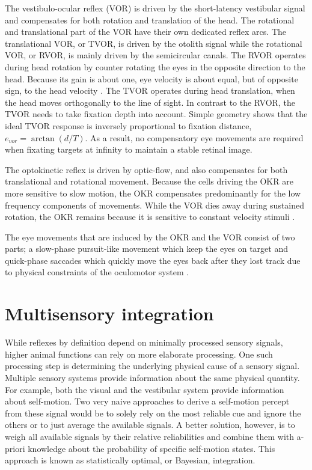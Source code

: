 The vestibulo-ocular reflex (VOR) is driven by the short-latency vestibular signal and compensates for both rotation and translation of the head. The rotational and translational part of the VOR have their own dedicated reflex arcs. The translational VOR, or TVOR, is driven by the otolith signal while the rotational VOR, or RVOR, is mainly driven by the semicircular canals. The RVOR operates during head rotation by counter rotating the eyes in the opposite direction to the head. Because its gain is about one, eye velocity is about equal, but of opposite sign, to the head velocity \cite{goldberg2012}. The TVOR operates during head translation, when the head moves orthogonally to the line of sight. In contrast to the RVOR, the TVOR needs to take fixation depth into account. Simple geometry shows that the ideal TVOR response is inversely proportional to fixation distance, $e_{vor} = \arctan(d/T)$. As a result, no compensatory eye movements are required when fixating targets at infinity to maintain a stable retinal image. 

The optokinetic reflex is driven by optic-flow, and also compensates for both translational and rotational movement. Because the cells driving the OKR are more sensitive to slow motion, the OKR compensates predominantly for the low frequency components of movements. While the VOR dies away during sustained rotation, the OKR remains because it is sensitive to constant velocity stimuli \cite{soodak1988}.

The eye movements that are induced by the OKR and the VOR consist of two parts; a slow-phase pursuit-like movement which keep the eyes on target and quick-phase saccades which quickly move the eyes back after they lost track due to physical constraints of the oculomotor system \cite{goldberg2012}.

\section{Multisensory integration}

While reflexes by definition depend on minimally processed sensory signals, higher animal functions can rely on more elaborate processing. One such processing step is determining the underlying physical cause of a sensory signal. Multiple sensory systems provide information about the same physical quantity. For example, both the visual and the vestibular system provide information about self-motion. Two very naive approaches to derive a self-motion percept from these signal would be to solely rely on the most reliable cue and ignore the others or to just average the available signals. A better solution, however, is to weigh all available signals by their relative reliabilities and combine them with a-priori knowledge about the probability of specific self-motion states. This approach is known as statistically optimal, or Bayesian, integration. 

